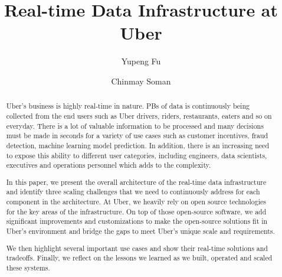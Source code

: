 \documentclass[sigconf]{acmart}
\begin{document}
\fancyhead{}
\title{Real-time Data Infrastructure at Uber}

\author{Yupeng Fu}

\author{Chinmay Soman}

\renewcommand{\shortauthors}{Fu, et al.}

\begin{abstract}
Uber’s business is highly real-time in nature. PBs of data is continuously being collected from the end users such as Uber drivers, riders, restaurants, eaters and so on everyday. There is a lot of valuable information to be processed and many decisions must be made in seconds for a variety of use cases such as customer incentives, fraud detection, machine learning model prediction. In addition, there is an increasing need to expose this ability to different user categories, including engineers, data scientists, executives and operations personnel which adds to the complexity. 

In this paper, we present the overall architecture of the real-time data infrastructure and identify three scaling challenges that we need to continuously address for each component in the architecture. At Uber, we heavily rely on open source technologies for the key areas of the infrastructure. On top of those open-source software, we add significant improvements and customizations to make the open-source solutions fit in Uber’s environment and bridge the gaps to meet Uber’s unique scale and requirements.

We then highlight several important use cases and show their real-time solutions and tradeoffs. Finally, we reflect on the lessons we learned as we built, operated and scaled these systems.

\end{abstract}
\end{document}
